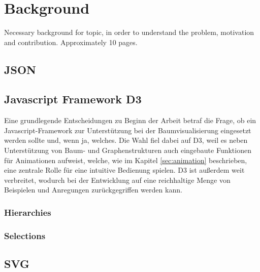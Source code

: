 \chapter{Background}
Necessary background for topic, in order to understand the problem, motivation and contribution. Approximately 10 pages.
\section{JSON}
\section{Javascript Framework D3}\label{sec:framework}
Eine grundlegende Entscheidungen zu Beginn der Arbeit betraf die Frage, ob ein Javascript-Framework zur Unterstützung bei der Baumvisualisierung eingesetzt werden sollte und, wenn ja, welches. Die Wahl fiel dabei auf D3, weil es neben Unterstützung von Baum- und Graphenstrukturen auch eingebaute Funktionen für Animationen aufweist, welche, wie im Kapitel \ref{sec:animation} beschrieben, eine zentrale Rolle für eine intuitive Bedienung spielen. D3 ist außerdem weit verbreitet, wodurch bei der Entwicklung auf eine reichhaltige Menge von Beispielen und Anregungen zurückgegriffen werden kann.
\subsection{Hierarchies}
\subsection{Selections}
\section{SVG}
